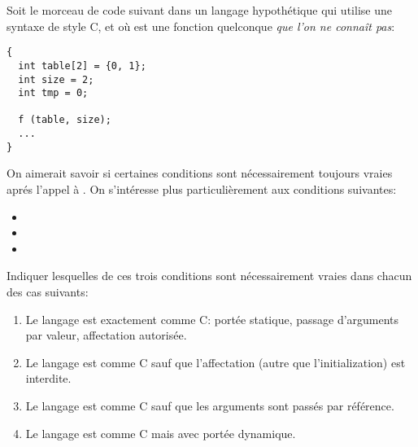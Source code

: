 \begin{Exercise}
\label{ex:raisonner}
  Soit le morceau de code suivant dans un langage hypothétique qui
utilise une syntaxe de style C, et où  est une fonction
quelconque \emph{que l'on ne connaît pas}:
\begin{verbatim}
{
  int table[2] = {0, 1};
  int size = 2;
  int tmp = 0;

  f (table, size);
  ...
}
\end{verbatim}
On aimerait savoir si certaines conditions sont nécessairement
toujours vraies aprés l'appel à .  On s'intéresse plus
particulièrement aux conditions suivantes:
\begin{itemize}
\item {}
\item {}
\item {}
\end{itemize}
Indiquer lesquelles de ces trois conditions sont nécessairement vraies
dans chacun des cas suivants:
\begin{enumerate}
\item Le langage est exactement comme C: portée statique, passage
  d'arguments par valeur, affectation autorisée.
\item Le langage est comme C sauf que l'affectation (autre que
  l'initialization) est interdite.
\item Le langage est comme C sauf que les arguments sont passés par
  référence.
\item Le langage est comme C mais avec portée dynamique.
\end{enumerate}
\end{Exercise}


